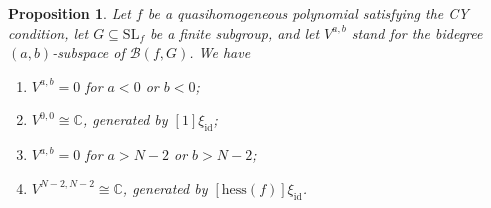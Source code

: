 \documentclass[pdftex]{sigma}
\numberwithin{equation}{section}
\newtheorem{Proposition}[Theorem]{Proposition}
 { \theoremstyle{definition}
\newtheorem{Definition}[Theorem]{Definition}
\newtheorem{Note}[Theorem]{Note}
\newtheorem{Example}[Theorem]{Example}
\newtheorem{Remark}[Theorem]{Remark} }
\newcommand{\CC}{{\mathbb{C}}}
\newcommand{\SL}{{\mathrm{SL}}}
\newcommand{\id}{\mathrm{id}}
\newcommand{\hess}{\mathrm{hess}}
\def\B{{\mathcal B}}
\begin{document}
\begin{Proposition}\label{proposition: diamond under CY}
	Let $f$ be a quasihomogeneous polynomial satisfying the CY condition, let $G \subseteq \SL_f$ be a finite subgroup, and let $V^{a,b}$ stand for the bidegree $(a,b)$-subspace of $\B(f,G)$. We have
	\begin{enumerate}\itemsep=0pt
	 \item[$(i)$] $V^{a,b} = 0$ for $a < 0$ or $b < 0$;
	 \item[$(ii)$] $V^{0,0} \cong \CC$, generated by $[1]\xi_\id$;
	 \item[$(iii)$] $V^{a,b} = 0$ for $a > N-2$ or $b > N-2$;
	 \item[$(iv)$] $V^{N-2,N-2} \cong \CC$, generated by $[\hess(f)]\xi_\id$.
	\end{enumerate}

\end{Proposition}
\end{document}
